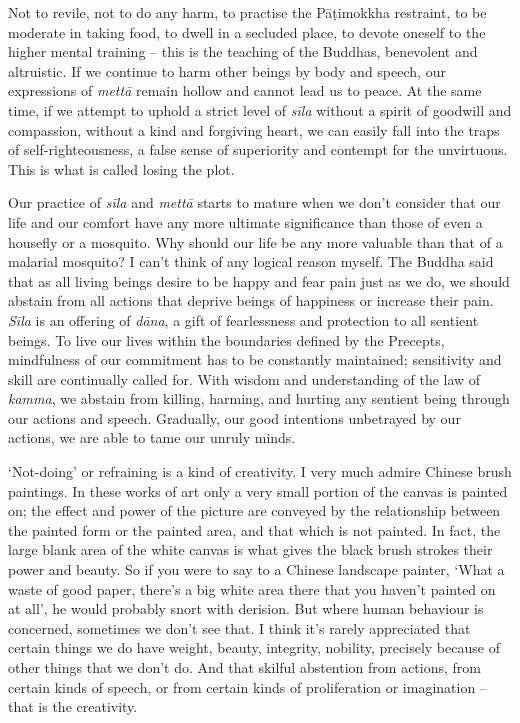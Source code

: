 Not to revile, not to do any harm, to practise the Pāṭimokkha restraint,
to be moderate in taking food, to dwell in a secluded place, to devote
oneself to the higher mental training -- this is the teaching of the
Buddhas, benevolent and altruistic. If we continue to harm other beings
by body and speech, our expressions of \emph{mettā} remain hollow and
cannot lead us to peace. At the same time, if we attempt to uphold a
strict level of \emph{sīla} without a spirit of goodwill and compassion, 
without a kind and forgiving heart, we can easily fall into the traps of
self-righteousness, a false sense of superiority and contempt for the
unvirtuous. This is what is called losing the plot. 

Our practice of \emph{sīla} and \emph{mettā} starts to mature when we
don't consider that our life and our comfort have any more ultimate
significance than those of even a housefly or a mosquito. Why should our
life be any more valuable than that of a malarial mosquito? I can't
think of any logical reason myself. The Buddha said that as all living
beings desire to be happy and fear pain just as we do, we should abstain
from all actions that deprive beings of happiness or increase their
pain. \emph{Sīla} is an offering of \emph{dāna}, a gift of fearlessness
and protection to all sentient beings. To live our lives within the
boundaries defined by the Precepts, mindfulness of our commitment has to
be constantly maintained; sensitivity and skill are continually called
for. With wisdom and understanding of the law of \emph{kamma}, we
abstain from killing, harming, and hurting any sentient being through
our actions and speech. Gradually, our good intentions unbetrayed by our
actions, we are able to tame our unruly minds. 

`Not-doing' or refraining is a kind of creativity. I very much admire
Chinese brush paintings. In these works of art only a very small portion
of the canvas is painted on; the effect and power of the picture are
conveyed by the relationship between the painted form or the painted
area, and that which is not painted. In fact, the large blank area of
the white canvas is what gives the black brush strokes their power and
beauty. So if you were to say to a Chinese landscape painter, `What a
waste of good paper, there's a big white area there that you haven't
painted on at all', he would probably snort with derision. But where
human behaviour is concerned, sometimes we don't see that. I think it's
rarely appreciated that certain things we do have weight, beauty, 
integrity, nobility, precisely because of other things that we don't do. 
And that skilful abstention from actions, from certain kinds of speech, 
or from certain kinds of proliferation or imagination -- that is the
creativity. 


